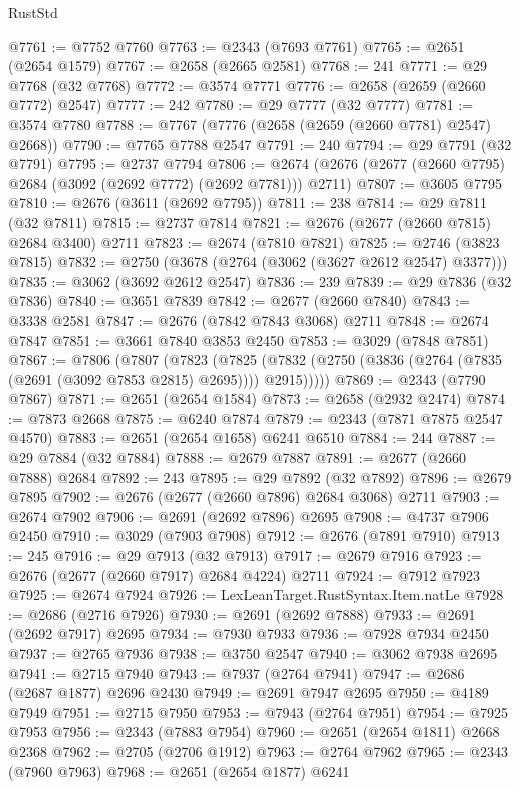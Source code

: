 \begin{lexlean}{RustStd}
\begin{coremodule}
@7761 := @7752 @7760
@7763 := @2343 (@7693 @7761)
@7765 := @2651 (@2654 @1579)
@7767 := @2658 (@2665 @2581)
@7768 := 241
@7771 := @29 @7768 (@32 @7768)
@7772 := @3574 @7771
@7776 := @2658 (@2659 (@2660 @7772) @2547)
@7777 := 242
@7780 := @29 @7777 (@32 @7777)
@7781 := @3574 @7780
@7788 := @7767 (@7776 (@2658 (@2659 (@2660 @7781) @2547) @2668))
@7790 := @7765 @7788 @2547
@7791 := 240
@7794 := @29 @7791 (@32 @7791)
@7795 := @2737 @7794
@7806 := @2674 (@2676 (@2677 (@2660 @7795) @2684 (@3092 (@2692 @7772) (@2692 @7781))) @2711)
@7807 := @3605 @7795
@7810 := @2676 (@3611 (@2692 @7795))
@7811 := 238
@7814 := @29 @7811 (@32 @7811)
@7815 := @2737 @7814
@7821 := @2676 (@2677 (@2660 @7815) @2684 @3400) @2711
@7823 := @2674 (@7810 @7821)
@7825 := @2746 (@3823 @7815)
@7832 := @2750 (@3678 (@2764 (@3062 (@3627 @2612 @2547) @3377)))
@7835 := @3062 (@3692 @2612 @2547)
@7836 := 239
@7839 := @29 @7836 (@32 @7836)
@7840 := @3651 @7839
@7842 := @2677 (@2660 @7840)
@7843 := @3338 @2581
@7847 := @2676 (@7842 @7843 @3068) @2711
@7848 := @2674 @7847
@7851 := @3661 @7840 @3853 @2450
@7853 := @3029 (@7848 @7851)
@7867 := @7806
    (@7807
      (@7823
        (@7825 (@7832 (@2750 (@3836 (@2764 (@7835 (@2691 (@3092 @7853 @2815) @2695)))) @2915)))))
@7869 := @2343 (@7790 @7867)
@7871 := @2651 (@2654 @1584)
@7873 := @2658 (@2932 @2474)
@7874 := @7873 @2668
@7875 := @6240 @7874
@7879 := @2343 (@7871 @7875 @2547 @4570)
@7883 := @2651 (@2654 @1658) @6241 @6510
@7884 := 244
@7887 := @29 @7884 (@32 @7884)
@7888 := @2679 @7887
@7891 := @2677 (@2660 @7888) @2684
@7892 := 243
@7895 := @29 @7892 (@32 @7892)
@7896 := @2679 @7895
@7902 := @2676 (@2677 (@2660 @7896) @2684 @3068) @2711
@7903 := @2674 @7902
@7906 := @2691 (@2692 @7896) @2695
@7908 := @4737 @7906 @2450
@7910 := @3029 (@7903 @7908)
@7912 := @2676 (@7891 @7910)
@7913 := 245
@7916 := @29 @7913 (@32 @7913)
@7917 := @2679 @7916
@7923 := @2676 (@2677 (@2660 @7917) @2684 @4224) @2711
@7924 := @7912 @7923
@7925 := @2674 @7924
@7926 := LexLeanTarget.RustSyntax.Item.natLe
@7928 := @2686 (@2716 @7926)
@7930 := @2691 (@2692 @7888)
@7933 := @2691 (@2692 @7917) @2695
@7934 := @7930 @7933
@7936 := @7928 @7934 @2450
@7937 := @2765 @7936
@7938 := @3750 @2547
@7940 := @3062 @7938 @2695
@7941 := @2715 @7940
@7943 := @7937 (@2764 @7941)
@7947 := @2686 (@2687 @1877) @2696 @2430
@7949 := @2691 @7947 @2695
@7950 := @4189 @7949
@7951 := @2715 @7950
@7953 := @7943 (@2764 @7951)
@7954 := @7925 @7953
@7956 := @2343 (@7883 @7954)
@7960 := @2651 (@2654 @1811) @2668 @2368
@7962 := @2705 (@2706 @1912)
@7963 := @2764 @7962
@7965 := @2343 (@7960 @7963)
@7968 := @2651 (@2654 @1877) @6241

\end{coremodule}
\end{lexlean}
